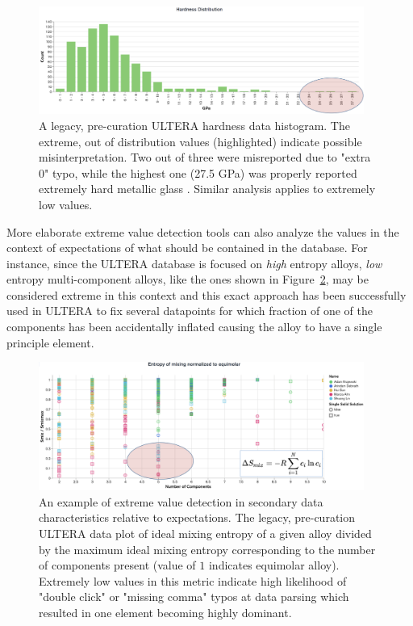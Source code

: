\begin{figure}[H]
    \centering
    \includegraphics[width=0.95\textwidth]{pyqalloy/pyqalloy_extremevalues.png}
    \caption{A legacy, pre-curation ULTERA hardness data histogram. The extreme, out of distribution values (highlighted) indicate possible misinterpretation. Two out of three were misreported due to "extra 0" typo, while the highest one (27.5 GPa) was properly reported  extremely hard metallic glass \cite{Kim2016DevelopmentRatios}. Similar analysis applies to extremely low values.}
    \label{pyqalloy:fig:extreme}
\end{figure}

More elaborate extreme value detection tools can also analyze the values in the context of expectations of what should be contained in the database. For instance, since the ULTERA database is focused on \emph{high} entropy alloys, \emph{low} entropy multi-component alloys, like the ones shown in Figure~\ref{pyqalloy:fig:lowentropy}, may be considered extreme in this context and this exact approach has been successfully used in ULTERA to fix several datapoints for which fraction of one of the components has been accidentally inflated causing the alloy to have a single principle element.

\begin{figure}[H]
    \centering
    \includegraphics[width=0.95\textwidth]{pyqalloy/pyqalloy_entropy.png}
    \caption{An example of extreme value detection in secondary data characteristics relative to expectations. The legacy, pre-curation ULTERA data plot of ideal mixing entropy of a given alloy divided by the maximum ideal mixing entropy corresponding to the number of components present (value of $1$ indicates equimolar alloy). Extremely low values in this metric indicate high likelihood of "double click" or "missing comma" typos at data parsing which resulted in one element becoming highly dominant.}
    \label{pyqalloy:fig:lowentropy}
\end{figure}


